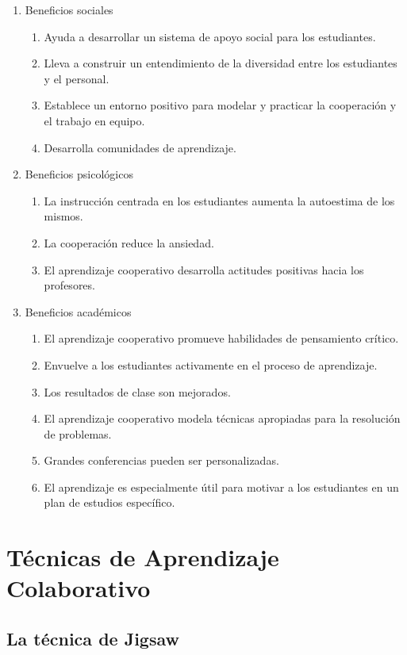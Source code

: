 \begin{enumerate}
  \item Beneficios sociales
  \begin{enumerate}
    \item Ayuda a desarrollar un sistema de apoyo social para los estudiantes.
    \item Lleva a construir un entendimiento de la diversidad entre los estudiantes y el personal.
    \item Establece un entorno positivo para modelar y practicar la cooperación y el trabajo en equipo.
    \item Desarrolla comunidades de aprendizaje.
  \end{enumerate}
  \item Beneficios psicológicos
  \begin{enumerate}
    \item La instrucción centrada en los estudiantes aumenta la autoestima de los mismos.
    \item La cooperación reduce la ansiedad.
    \item El aprendizaje cooperativo desarrolla actitudes positivas hacia los profesores.
  \end{enumerate}
  \item Beneficios académicos
  \begin{enumerate}
    \item El aprendizaje cooperativo promueve habilidades de pensamiento crítico.
    \item Envuelve a los estudiantes activamente en el proceso de aprendizaje.
    \item Los resultados de clase son mejorados.
    \item El aprendizaje cooperativo modela técnicas apropiadas para la resolución de problemas.
    \item Grandes conferencias pueden ser personalizadas.
    \item El aprendizaje es especialmente útil para motivar a los estudiantes en un plan de estudios específico.
  \end{enumerate}
\end{enumerate}

\section{Técnicas de Aprendizaje Colaborativo}

\subsection{La técnica de Jigsaw}

